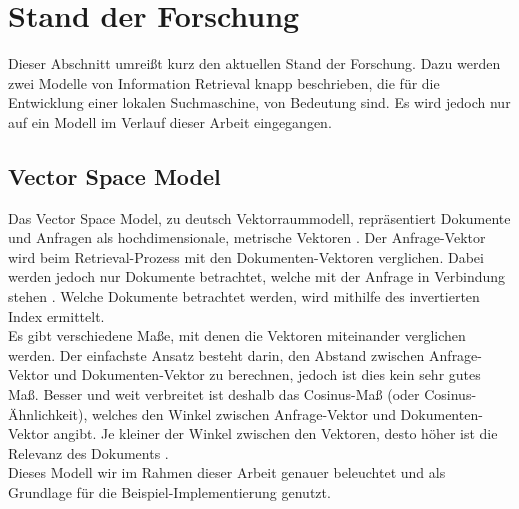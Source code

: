 \section{Stand der Forschung}
Dieser Abschnitt umreißt kurz den aktuellen Stand der Forschung. Dazu werden zwei Modelle von Information Retrieval knapp beschrieben, die für die Entwicklung einer lokalen Suchmaschine, von Bedeutung sind. Es wird jedoch nur auf ein Modell im Verlauf dieser Arbeit eingegangen.
\\

\subsection{Vector Space Model}
Das Vector Space Model, zu deutsch Vektorraummodell, repräsentiert Dokumente und Anfragen als hochdimensionale, metrische Vektoren \cite{VR_Retrieval}.
Der Anfrage-Vektor wird beim Retrieval-Prozess mit den Dokumenten-Vektoren verglichen. Dabei werden jedoch nur Dokumente betrachtet, welche mit der Anfrage in Verbindung stehen \cite{klass_IR}. Welche Dokumente betrachtet werden, wird mithilfe des invertierten Index ermittelt.
\\
Es gibt verschiedene Maße, mit denen die Vektoren miteinander verglichen werden. Der einfachste Ansatz besteht darin, den Abstand zwischen Anfrage-Vektor und Dokumenten-Vektor zu berechnen, jedoch ist dies kein sehr gutes Maß. Besser und weit verbreitet ist deshalb das Cosinus-Maß (oder Cosinus-Ähnlichkeit), welches den Winkel zwischen Anfrage-Vektor und Dokumenten-Vektor angibt. Je kleiner der Winkel zwischen den Vektoren, desto höher ist die Relevanz des Dokuments \cite{IR_Uni_Duisburg}.
\\
Dieses Modell wir im Rahmen dieser Arbeit genauer beleuchtet und als Grundlage für die Beispiel-Implementierung genutzt.

\begin{comment}
	\subsection{Probabilistische Ansätze}
	Probabilistische Ansätze basieren auf Wahrscheinlichkeiten. Hierbei wird eine Abschätzung der Wahrscheinlichkeit berechnet, mit der ein Dokument $d$ bezüglich einer Anfrage $q$ relevant ist \cite{IR_Uni_Duisburg}. Zur Abschätzung der Wahrscheinlichkeit gibt es verschiedene Ansätze, die hier jedoch nicht weiter thematisiert werden. Bei allen praktisch nutzbaren Ansätzen sind jedoch eine - je nach Ansatz - große oder kleine Menge von Zusatzinformationen über die Dokumentenkollektion nötig \cite{IR_Uni_Duisburg}.
\end{comment}